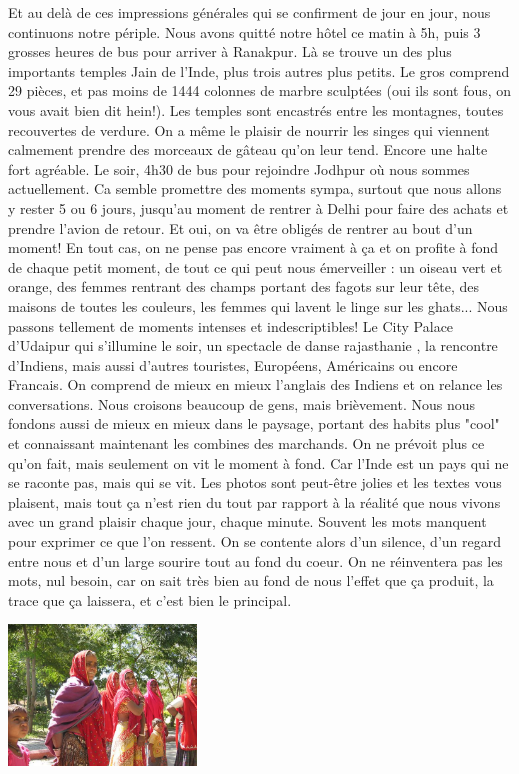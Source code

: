 \begin{multicols}{2}
Et au delà de ces impressions générales qui se confirment de jour en jour, nous continuons notre périple. Nous avons quitté notre hôtel ce matin à 5h, puis 3 grosses heures de bus pour arriver à Ranakpur. Là se trouve un des plus importants temples Jain de l'Inde, plus trois autres plus petits. Le gros comprend 29 pièces, et pas moins de 1444 colonnes de marbre sculptées (oui ils sont fous, on vous avait bien dit hein!). Les temples sont encastrés entre les montagnes, toutes recouvertes de verdure. On a même le plaisir de nourrir les singes qui viennent calmement prendre des morceaux de gâteau qu'on leur tend. Encore une halte fort agréable. Le soir, 4h30 de bus pour rejoindre Jodhpur où nous sommes actuellement. Ca semble promettre des moments sympa, surtout que nous allons y rester 5 ou 6 jours, jusqu'au moment de rentrer à Delhi pour faire des achats et prendre l'avion de retour. Et oui, on va être obligés de rentrer au bout d'un moment! En tout cas, on ne pense pas encore vraiment à ça et on profite à fond de chaque petit moment, de tout ce qui peut nous émerveiller : un oiseau vert et orange, des femmes rentrant des champs portant des fagots sur leur tête, des maisons de toutes les couleurs, les femmes qui lavent le linge sur les ghats... Nous passons tellement de moments intenses et indescriptibles! Le City Palace d'Udaipur qui s'illumine le soir, un spectacle de danse rajasthanie , la rencontre d'Indiens, mais aussi d'autres touristes, Européens, Américains ou encore Francais. On comprend de mieux en mieux l'anglais des Indiens et on relance les conversations. Nous croisons beaucoup de gens, mais brièvement. Nous nous fondons aussi de mieux en mieux dans le paysage, portant des habits plus "cool" et connaissant maintenant les combines des marchands. On ne prévoit plus ce qu'on fait, mais seulement on vit le moment à fond. Car l'Inde est un pays qui ne se raconte pas, mais qui se vit. Les photos sont peut-être jolies et les textes vous plaisent, mais tout ça n'est rien du tout par rapport à la réalité que nous vivons avec un grand plaisir chaque jour, chaque minute. Souvent les mots manquent pour exprimer ce que l'on ressent. On se contente alors d'un silence, d'un regard entre nous et d'un large sourire tout au fond du coeur. On ne réinventera pas les mots, nul besoin, car on sait très bien au fond de nous l'effet que ça produit, la trace que ça laissera, et c'est bien le principal.

\smallbreak
\hspace*{-0.65cm}
\includegraphics[width=5cm]{articles/Il-commence-a-faire-chaud/sari.jpg}
\smallbreak


\end{multicols}
